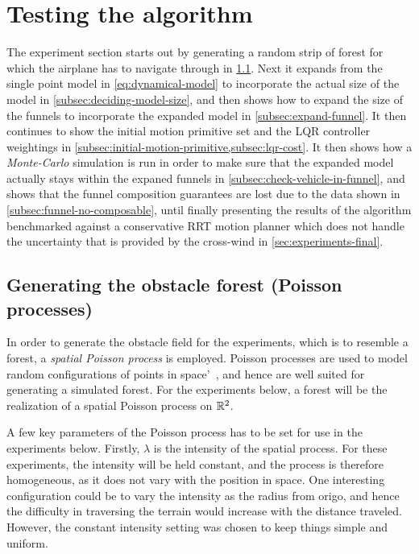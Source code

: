 \section{Testing the \rrtfunnel{} algorithm}

The experiment section starts out by generating a random strip of forest for
which the airplane has to navigate through in \cref{sec:Poisson-Process}. Next
it expands from the single point model in \cref{eq:dynamical-model} to
incorporate the actual size of the model in \cref{subsec:deciding-model-size},
and then shows how to expand the size of the funnels to incorporate the expanded
model in \cref{subsec:expand-funnel}. It then continues to show the initial
motion primitive set and the \ac{LQR} controller weightings in
\cref{subsec:initial-motion-primitive,subsec:lqr-cost}. It then shows how a
\textit{Monte-Carlo} simulation is run in order to make sure that the expanded
model actually stays within the expaned funnels in
\cref{subsec:check-vehicle-in-funnel}, and shows that the funnel composition
guarantees are lost due to the data shown in \cref{subsec:funnel-no-composable},
until finally presenting the results of the \rrtfunnel{} algorithm benchmarked
against a conservative \ac{RRT} motion planner which does not handle the
uncertainty that is provided by the cross-wind in \cref{sec:experiments-final}.

\subsection{Generating the obstacle forest (Poisson processes)}
\label{sec:Poisson-Process}

In order to generate the obstacle field for the experiments, which is to
resemble a forest, a \textit{spatial Poisson process} is employed. Poisson
processes are used to model random configurations of points in
space'~\cite{Kroese_2014}, and hence are well suited for generating a simulated
forest. For the experiments below, a forest will be the realization of a spatial
Poisson process on \(\mathbb{R}^2\).

A few key parameters of the Poisson process has to be set for use in the
experiments below. Firstly, \(\lambda\) is the intensity of the spatial process.
For these experiments, the intensity will be held constant, and the process is
therefore homogeneous, as it does not vary with the position in space. One
interesting configuration could be to vary the intensity as the radius from
origo, and hence the difficulty in traversing the terrain would increase with
the distance traveled. However, the constant intensity setting was chosen to
keep things simple and uniform.

